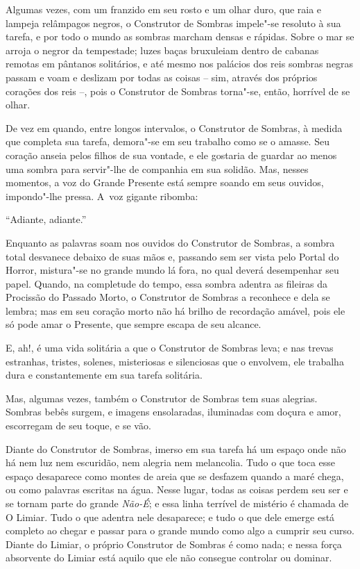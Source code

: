 
Algumas vezes, com um franzido em seu rosto e um olhar duro, que raia e
lampeja relâmpagos negros, o Construtor de Sombras impele"-se resoluto à
sua tarefa, e por todo o mundo as sombras marcham densas e rápidas.
Sobre o mar se arroja o negror da tempestade; luzes baças bruxuleiam
dentro de cabanas remotas em pântanos solitários, e até mesmo nos
palácios dos reis sombras negras passam e voam e deslizam por todas as
coisas -- sim, através dos próprios corações dos reis --, pois o
Construtor de Sombras torna"-se, então, horrível de se olhar.

De vez em quando, entre longos intervalos, o Construtor de Sombras, à
medida que completa sua tarefa, demora"-se em seu trabalho como se o
amasse. Seu coração anseia pelos filhos de sua vontade, e ele gostaria
de guardar ao menos uma sombra para servir"-lhe de companhia em sua
solidão. Mas, nesses momentos, a voz do Grande Presente está sempre soando em seus ouvidos, impondo"-lhe pressa. A~voz gigante ribomba:

``Adiante, adiante.''

Enquanto as palavras soam nos ouvidos do Construtor de Sombras, a sombra
total desvanece debaixo de suas mãos e, passando sem ser vista pelo
Portal do Horror, mistura"-se no grande mundo lá fora, no qual deverá
desempenhar seu papel. Quando, na completude do tempo, essa sombra
adentra as fileiras da Procissão do Passado Morto, o Construtor de
Sombras a reconhece e dela se lembra; mas em seu coração morto não há
brilho de recordação amável, pois ele só pode amar o Presente, que
sempre escapa de seu alcance.

E, ah!, é uma vida solitária a que o Construtor de Sombras leva; e nas
trevas estranhas, tristes, solenes, misteriosas e silenciosas que o
envolvem, ele trabalha dura e constantemente em sua tarefa solitária.

Mas, algumas vezes, também o Construtor de Sombras tem suas alegrias.
Sombras bebês surgem, e imagens ensolaradas, iluminadas com doçura e
amor, escorregam de seu toque, e se vão.

Diante do Construtor de Sombras, imerso em sua tarefa há um espaço onde não
há nem luz nem escuridão, nem alegria nem melancolia. Tudo o que toca
esse espaço desaparece como montes de areia que se desfazem quando a maré
chega, ou como palavras escritas na água. Nesse lugar, todas as coisas perdem seu
ser e se tornam parte do grande \emph{Não-É}; e essa linha terrível de
mistério é chamada de O Limiar. Tudo o que adentra nele desaparece; e
tudo o que dele emerge está completo ao chegar e passar para o grande
mundo como algo a cumprir seu curso. Diante do Limiar, o próprio
Construtor de Sombras é como nada; e nessa força absorvente do Limiar
está aquilo que ele não consegue controlar ou dominar.

